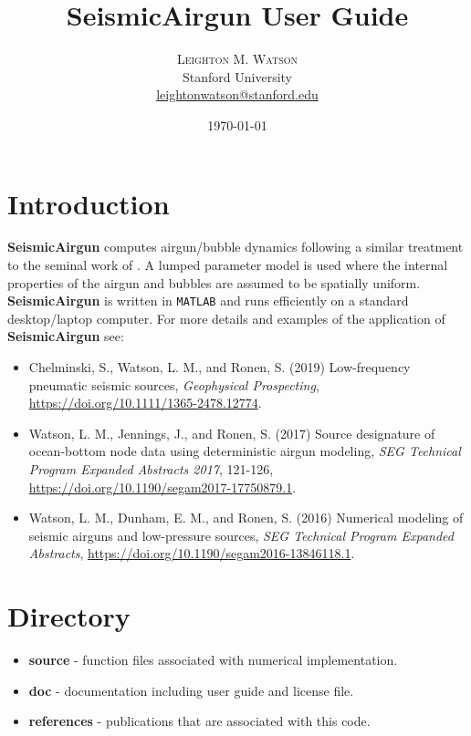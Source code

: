 \documentclass[10pt]{article}
\title{SeismicAirgun User Guide} %
\author{%
\textsc{Leighton M. Watson} \\%
\normalsize Stanford University \\ %
\normalsize \href{mailto:leightonwatson@stanford.edu}{leightonwatson@stanford.edu} %
}
\date{\today} %
\begin{document}
\maketitle


\section{Introduction}
{\bf SeismicAirgun} computes airgun/bubble dynamics following a similar treatment to the seminal work of \citet{Ziolkowski1970}. A lumped parameter model is used where the internal properties of the airgun and bubbles are assumed to be spatially uniform. {\bf SeismicAirgun} is written in \texttt{MATLAB} and runs efficiently on a standard desktop/laptop computer. For more details and examples of the application of {\bf SeismicAirgun} see:
\begin{itemize}
\item Chelminski, S., Watson, L. M., and Ronen, S. (2019) Low-frequency pneumatic seismic sources, \emph{Geophysical Prospecting}, \href{https://doi.org/10.1111/1365-2478.12774}{https://doi.org/10.1111/1365-2478.12774}.
\item Watson, L. M., Jennings, J., and Ronen, S. (2017) Source designature of ocean-bottom node data using deterministic airgun modeling, \emph{SEG Technical Program Expanded Abstracts 2017}, 121-126, \href{https://doi.org/10.1190/segam2017-17750879.1}{https://doi.org/10.1190/segam2017-17750879.1}.
\item Watson, L. M., Dunham, E. M., and Ronen, S. (2016) Numerical modeling of seismic airguns and low-pressure sources, \emph{SEG Technical Program Expanded Abstracts}, \href{https://doi.org/10.1190/segam2016-13846118.1}{https://doi.org/10.1190/\-segam2016-13846118.1}.
\end{itemize}

\section{Directory}
\begin{itemize}
\item{\bf source} - function files associated with numerical implementation. 
\item {\bf doc} - documentation including user guide and license file.
\item {\bf references} - publications that are associated with this code.
\end{itemize}
\end{document}
